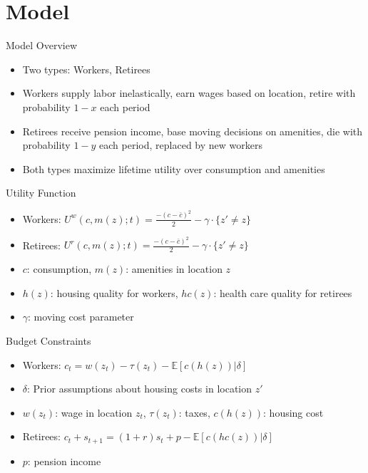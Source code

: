 \documentclass{beamer}
\begin{document}
\section{Model}
\begin{frame}{Model Overview}
  \begin{itemize}
    \item Two types: Workers, Retirees
    \item Workers supply labor inelastically, earn wages based on location, retire with probability $1-x$ each period
    \item Retirees receive pension income, base moving decisions on amenities, die with probability $1-y$ each period, replaced by new workers
    \item Both types maximize lifetime utility over consumption and amenities
  \end{itemize}
\end{frame}
\begin{frame}{Utility Function}
  \begin{itemize}
    \item Workers: $U^w(c, m(z);t) = \frac{-(c-\bar{c})^2}{2} - \gamma\cdot\{z'\ne z\}$
    \item Retirees: $U^r(c, m(z);t) = \frac{-(c-\bar{c})^2}{2} - \gamma\cdot\{z'\ne z\}$
    \item $c$: consumption, $m(z)$: amenities in location $z$
    \item $h(z)$: housing quality for workers, $hc(z)$: health care quality for retirees
    \item $\gamma$: moving cost parameter
  \end{itemize}
\end{frame}
\begin{frame}{Budget Constraints}
  \begin{itemize}
    \item Workers: $c_t = w(z_t) - \tau(z_t) - \mathbb{E}[c(h(z))|\delta]$
    \item $\delta$: Prior assumptions about housing costs in location $z'$
    \item $w(z_t)$: wage in location $z_t$, $\tau(z_t)$: taxes, $c(h(z))$: housing cost
    \item Retirees: $c_t + s_{t+1} = (1 + r)s_t + p - \mathbb{E}[c(hc(z))|\delta]$
    \item $p$: pension income
  \end{itemize}
\end{frame}
\end{document}
